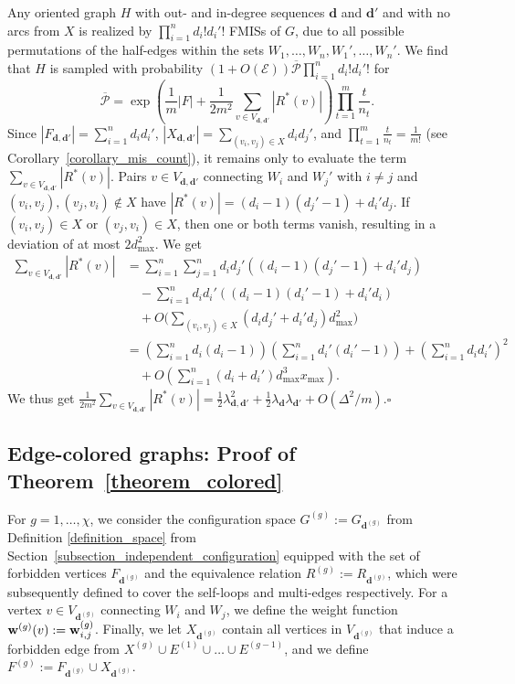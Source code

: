 \documentclass{article}
\theoremstyle{plain}
\theoremstyle{remark}
\theoremstyle{plain}
\numberwithin{equation}{section}
\renewcommand{\d}{{\boldsymbol{d}}}
\renewcommand{\b}{{\bf{w}}}
\begin{document}
	Any oriented graph $H$ with out- and in-degree sequences $\d$ and $\d'$ and with no arcs from $X$ is realized by $\prod_{i=1}^{n}d_i!d_i'!$ FMISs of $G$, due to all possible permutations of the half-edges within the sets $W_1,\ldots,W_n,W_1',\ldots,W_{n}'$. We find that $H$ is sampled with probability $(1+O(\mathscr{E}))\overline{\mathscr{P}}\prod_{i=1}^{n}d_i!d_i'!$ for $$\overline{\mathscr{P}}=\exp\left(\frac1{m}|F|+\frac1{2m^2}\sum_{v\in V_{\d,\d'}}|R^*(v)|\right)\prod_{t=1}^{m}\frac{t}{n_t}.$$ Since $|F_{\d,\d'}|=\sum_{i=1}^{n}d_id_i'$, $|X_{\d,\d'}|=\sum_{(v_i,v_j)\in X}d_id_j'$, and $\prod_{t=1}^{m}\frac{t}{n_t}=\frac1{m!}$ (see Corollary~\ref{corollary_mis_count}), it remains only to evaluate the term $\sum_{v\in V_{\d,\d'}}|R^*(v)|$. Pairs $v\in V_{\d,\d'}$ connecting $W_i$ and $W_j'$ with $i\neq j$ and $(v_i,v_j),(v_j,v_i)\not\in X$ have $|R^*(v)|=(d_i-1)(d_j'-1)+d_i'd_j$. If $(v_i,v_j)\in X$ or $(v_j,v_i)\in X$, then one or both terms vanish, resulting in a deviation of at most $2d_{\max}^2$. We get
	\begin{align}
		\sum_{v\in V_{\d,\d'}}|R^*(v)|
		&=\sum_{i=1}^{n}\sum_{j=1}^{n}d_id_j'((d_i-1)(d_j'-1)+d_i'd_j)
		\\&\quad-\sum_{i=1}^{n}d_id_i'((d_i-1)(d_i'-1)+d_i'd_i)
		\\&\quad+O\Bigg(\sum_{(v_i,v_j)\in X}(d_id_j'+d_i'd_j)d_{\max}^2\Bigg)
		\\&=\left(\sum_{i=1}^{n}d_i(d_i-1)\right)\left(\sum_{i=1}^{n}d_i'(d_i'-1)\right)+\left(\sum_{i=1}^{n}d_id_i'\right)^2
		\\&\quad+O\left(\sum_{i=1}^{n}(d_i+d_i')d_{\max}^3x_{\max}\right).
	\end{align}
	We thus get $\frac1{2m^2}\sum_{v\in V_{\d,\d'}}|R^*(v)|=\frac12\lambda_{\d,\d'}^2+\frac12\lambda_\d\lambda_{\d'}+O(\Delta^2/m)$.\hfill$\square$
	
	\subsection{Edge-colored graphs: Proof of Theorem~\ref{theorem_colored}}\label{subsection_applications_colored}
	
	For $g=1,\ldots,\chi$, we consider the configuration space $G^{(g)}:=G_{\d^{(g)}}$ from Definition \ref{definition_space} from Section~\ref{subsection_independent_configuration} equipped with the set of forbidden vertices $F_{\d^{(g)}}$ and the equivalence relation $R^{(g)}:=R_{\d^{(g)}}$, which were subsequently defined to cover the self-loops and multi-edges respectively. For a vertex $v\in V_{\d^{(g)}}$ connecting $W_i$ and $W_j$, we define the weight function $\b^{(g)}(v):=\b_{i,j}^{(g)}$. Finally, we let $X_{\d^{(g)}}$ contain all vertices in $V_{\d^{(g)}}$ that induce a forbidden edge from $X^{(g)}\cup E^{(1)}\cup\ldots\cup E^{(g-1)}$, and we define $F^{(g)}:=F_{\d^{(g)}}\cup X_{\d^{(g)}}$.
	
\end{document}
